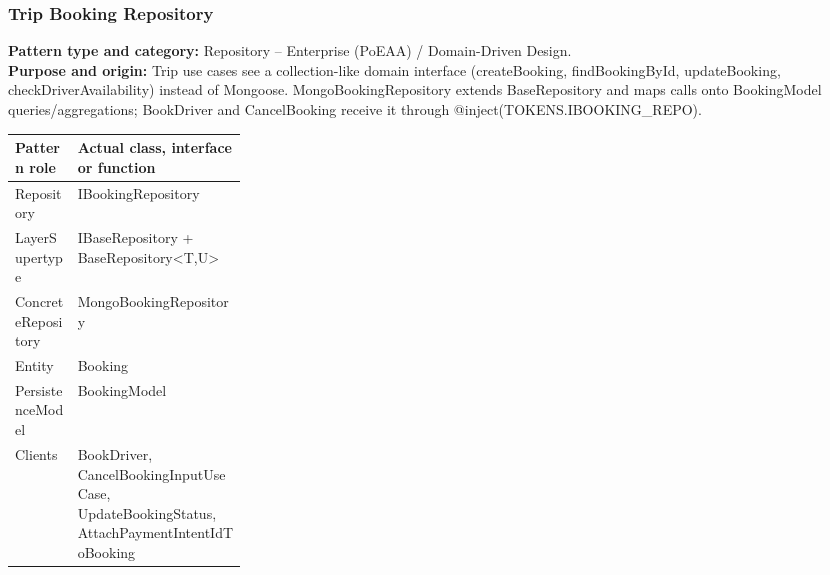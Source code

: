 \documentclass[11pt,a4paper]{article}
\begin{document}
\subsubsection*{Trip Booking Repository}
\textbf{Pattern type and category:} Repository -- Enterprise (PoEAA) / Domain-Driven Design.\\
\textbf{Purpose and origin:} Trip use cases see a collection-like domain interface (createBooking, findBookingById, updateBooking, checkDriverAvailability) instead of Mongoose. MongoBookingRepository extends BaseRepository and maps calls onto BookingModel queries/aggregations; BookDriver and CancelBooking receive it through @inject(TOKENS.IBOOKING\_REPO).

\noindent\begin{tabularx}{\linewidth}{@{}P{0.27\linewidth}Y@{}}
\toprule Pattern role & Actual class, interface or function \\ \midrule
Repository & IBookingRepository \\
LayerSupertype & IBaseRepository + BaseRepository\textless{}T,U\textgreater{} \\
ConcreteRepository & MongoBookingRepository \\
Entity & Booking \\
PersistenceModel & BookingModel \\
Clients & BookDriver, CancelBookingInputUseCase, UpdateBookingStatus, AttachPaymentIntentIdToBooking \\
\bottomrule
\end{tabularx}
\end{document}
